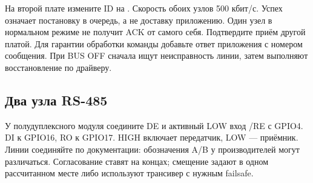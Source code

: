 
На второй плате измените ID на . Скорость обоих узлов 500 кбит/с.
Успех  означает постановку в очередь, а не доставку приложению.
Один узел в нормальном режиме не получит ACK от самого себя. Подтвердите приём другой платой.
Для гарантии обработки команды добавьте ответ приложения с номером сообщения.
При BUS OFF сначала ищут неисправность линии, затем выполняют восстановление по драйверу.

\subsection{Два узла RS-485}
У полудуплексного модуля соедините DE и активный LOW вход /RE с GPIO4. DI к GPIO16,
RO к GPIO17. HIGH включает передатчик, LOW --- приёмник. Линии соединяйте по документации:
обозначения A/B у производителей могут различаться. Согласование ставят на концах;
смещение задают в одном рассчитанном месте либо используют трансивер с нужным failsafe.

